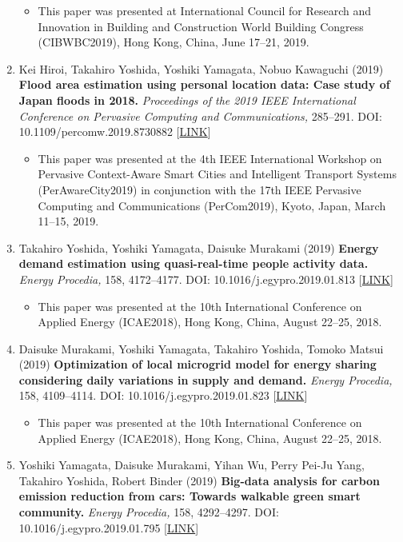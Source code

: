 \documentclass[]{book}
\providecommand{\tightlist}{%
  \setlength{\itemsep}{0pt}\setlength{\parskip}{0pt}}
\begin{document}
\begin{enumerate}
  \begin{itemize}
  \tightlist
  \item
    This paper was presented at International Council for Research and Innovation in Building and Construction World Building Congress (CIBWBC2019), Hong Kong, China, June 17--21, 2019.
  \end{itemize}
\item
  Kei Hiroi, Takahiro Yoshida, Yoshiki Yamagata, Nobuo Kawaguchi (2019)
  \textbf{Flood area estimation using personal location data: Case study of Japan floods in 2018.}
  \emph{Proceedings of the 2019 IEEE International Conference on Pervasive Computing and Communications,} 285--291.
  DOI: 10.1109/percomw.2019.8730882 {[}\href{https://ieeexplore.ieee.org/document/8730882}{LINK}{]}

  \begin{itemize}
  \tightlist
  \item
    This paper was presented at the 4th IEEE International Workshop on Pervasive Context-Aware Smart Cities and Intelligent Transport Systems (PerAwareCity2019) in conjunction with the 17th IEEE Pervasive Computing and Communications (PerCom2019), Kyoto, Japan, March 11--15, 2019.
  \end{itemize}
\item
  Takahiro Yoshida, Yoshiki Yamagata, Daisuke Murakami (2019)
  \textbf{Energy demand estimation using quasi-real-time people activity data.}
  \emph{Energy Procedia,} 158, 4172--4177.
  DOI: 10.1016/j.egypro.2019.01.813 {[}\href{https://www.sciencedirect.com/science/article/pii/S1876610219308537}{LINK}{]}

  \begin{itemize}
  \tightlist
  \item
    This paper was presented at the 10th International Conference on Applied Energy (ICAE2018), Hong Kong, China, August 22--25, 2018.
  \end{itemize}
\item
  Daisuke Murakami, Yoshiki Yamagata, Takahiro Yoshida, Tomoko Matsui (2019)
  \textbf{Optimization of local microgrid model for energy sharing considering daily variations in supply and demand.}
  \emph{Energy Procedia,} 158, 4109--4114.
  DOI: 10.1016/j.egypro.2019.01.823 {[}\href{https://www.sciencedirect.com/science/article/pii/S187661021930863X}{LINK}{]}

  \begin{itemize}
  \tightlist
  \item
    This paper was presented at the 10th International Conference on Applied Energy (ICAE2018), Hong Kong, China, August 22--25, 2018.
  \end{itemize}
\item
  Yoshiki Yamagata, Daisuke Murakami, Yihan Wu, Perry Pei-Ju Yang, Takahiro Yoshida, Robert Binder (2019)
  \textbf{Big-data analysis for carbon emission reduction from cars: Towards walkable green smart community.}
  \emph{Energy Procedia,} 158, 4292--4297.
  DOI: 10.1016/j.egypro.2019.01.795 {[}\href{https://www.sciencedirect.com/science/article/pii/S1876610219308331}{LINK}{]}


\end{enumerate}
\end{document}
